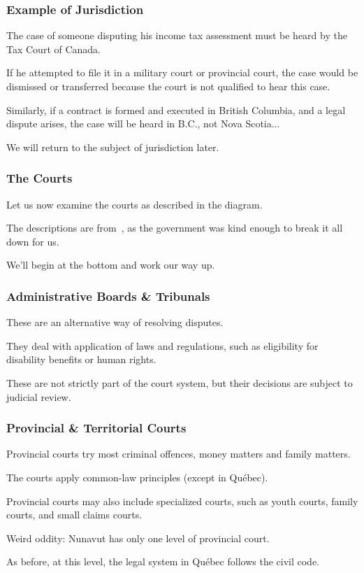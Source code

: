 \begin{frame}
\frametitle{Example of Jurisdiction}

The case of someone disputing his income tax assessment must be heard by the Tax Court of Canada.

If he attempted to file it in a military court or provincial court, the case would be dismissed or transferred because the court is not qualified to hear this case.

Similarly, if a contract is formed and executed in British Columbia, and a legal dispute arises, the case will be heard in B.C., not Nova Scotia...

We will return to the subject of jurisdiction later.

\end{frame}



\begin{frame}
\frametitle{The Courts}

Let us now examine the courts as described in the diagram.

The descriptions are from~\cite{just07}, as the government was kind enough to break it all down for us. 

We'll begin at the bottom and work our way up.

\end{frame}




\begin{frame}
\frametitle{Administrative Boards \& Tribunals}

These are an alternative way of resolving disputes.

They deal with application of laws and regulations, such as eligibility for disability benefits or human rights.

These are not strictly part of the court system, but their decisions are subject to judicial review.

\end{frame}



\begin{frame}
\frametitle{Provincial \& Territorial Courts}

Provincial courts try most criminal offences, money matters and family matters. 

The courts apply common-law principles (except in Qu\'ebec).

Provincial courts may also include specialized courts, such as youth courts, family courts, and small claims courts. 

Weird oddity: Nunavut has only one level of provincial court.

As before, at this level, the legal system in Qu\'ebec follows the civil code.

\end{frame}



